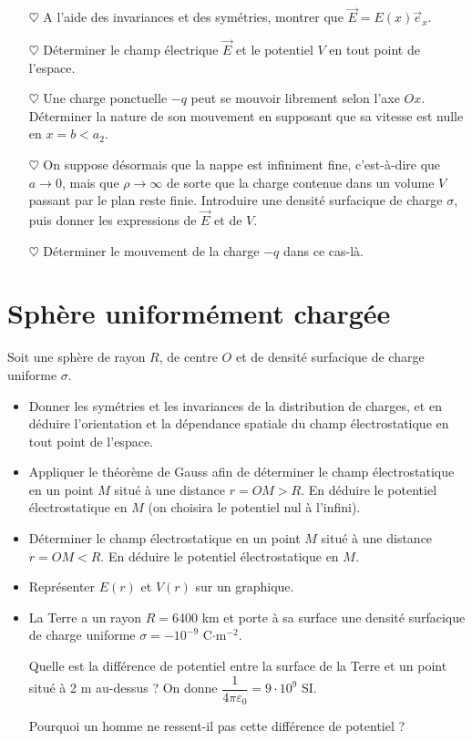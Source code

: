 \documentclass{report}
\begin{document}
\begin{itemize}

	\item[$\heartsuit$] A l'aide des invariances et des symétries, montrer que $\vec{E}=E(x)\vec{e}_x$.

	\item[$\heartsuit$] Déterminer le champ électrique $\vec{E}$ et le potentiel $V$ en tout point de l'espace.
	
	\item[$\heartsuit$] Une charge ponctuelle $-q$ peut se mouvoir librement selon l'axe $Ox$. Déterminer la nature de son mouvement en supposant que sa vitesse est nulle en $x=b<a_2$.
	
	\item[$\heartsuit$] On suppose désormais que la nappe est infiniment fine, c'est-à-dire que $a\longrightarrow0$, mais que $\rho\longrightarrow\infty$ de sorte que la charge contenue dans un volume $V$ passant par le plan reste finie. Introduire une densité surfacique de charge $\sigma$, puis donner les expressions de $\vec{E}$ et de $V$.
	
	\item[$\heartsuit$] Déterminer le mouvement de la charge $-q$ dans ce cas-là. 
	
\end{itemize}

\newpage

\section*{Sphère uniformément chargée}
Soit une sphère de rayon $R$, de centre $O$ et de densité surfacique de charge uniforme $\sigma$.

\begin{itemize}
\item Donner les symétries et les invariances de la distribution de charges, et en déduire l'orientation et la dépendance spatiale du champ électrostatique en tout point de l'espace.
\item Appliquer le théorème de Gauss afin de déterminer le champ électrostatique en un point $M$ situé à une distance $r=OM>R$. En déduire le potentiel électrostatique en $M$ (on choisira le potentiel nul à l'infini).
\item Déterminer le champ électrostatique en un point $M$ situé à une distance $r=OM<R$. En déduire le potentiel électrostatique en $M$.
\item Représenter $E(r)$ et $V(r)$ sur un graphique.
\item La Terre a un rayon $R=$6400 km et porte à sa surface une densité surfacique de charge uniforme $\sigma=-10^{-9}$ C$\cdot$m$^{-2}$.

Quelle est la différence de potentiel entre la surface de la Terre et un point situé à 2 m au-dessus ? On donne $\dfrac{1}{4\pi\varepsilon_0}=9\cdot 10^9$ SI.

Pourquoi un homme ne ressent-il pas cette différence de potentiel ? %
\end{itemize}
\end{document}
